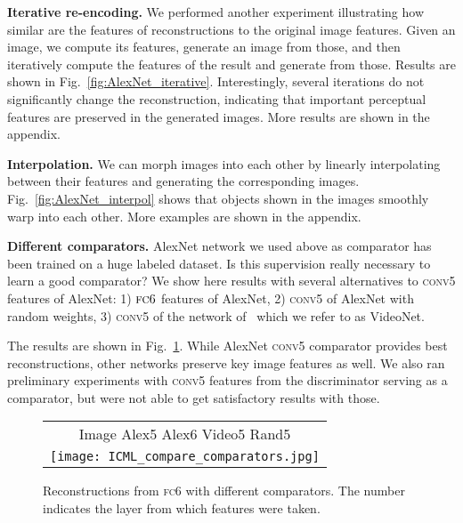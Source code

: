 \documentclass{article}
\newcommand{\conv}{\textsc{conv}}
\newcommand{\fc}{\textsc{fc}}
\begin{document}
\textbf{Iterative re-encoding.}
We performed another experiment illustrating how similar are the features of reconstructions to the original image features.
Given an image, we compute its features, generate an image from those, and then iteratively compute the features of the result and generate from those.
Results are shown in Fig.~\ref{fig:AlexNet_iterative}.
Interestingly, several iterations do not significantly change the reconstruction, indicating that important perceptual features are preserved in the generated images. 
More results are shown in the appendix.

\textbf{Interpolation.}
We can morph images into each other by linearly interpolating between their features and generating the corresponding images.
Fig.~\ref{fig:AlexNet_interpol} shows that objects shown in the images smoothly warp into each other.
More examples are shown in the appendix.

\textbf{Different comparators.}
AlexNet network we used above as comparator has been trained on a huge labeled dataset.
Is this supervision really necessary to learn a good comparator?
We show here results with several alternatives to \conv5 features of AlexNet: 1) $\fc6$ features of AlexNet, 2) \conv5 of AlexNet with random weights, 3) \conv5 of the network of~\citet{Wang_ICCV2015} which we refer to as VideoNet.

The results are shown in Fig.~\ref{fig:different_comparators}.
While AlexNet \conv5 comparator provides best reconstructions, other networks preserve key image features as well.
We also ran preliminary experiments with \conv5 features from the discriminator serving as a comparator, but were not able to get satisfactory results with those.

\begin{figure}
\begin{center}
\setlength{\tabcolsep}{0.1cm}
\renewcommand{\arraystretch}{1}
  \begin{tabular}{c}
  Image \;\;\;\; Alex5 \;\;\; Alex6 \;\;\; Video5 \;\;\;  Rand5 \\
  \texttt{[image: ICML\_compare\_comparators.jpg]}\\
   \end{tabular}
\end{center}
   \caption{Reconstructions from \fc6 with different comparators. The number indicates the layer from which features were taken.}
\label{fig:different_comparators}
\end{figure}
\end{document}
